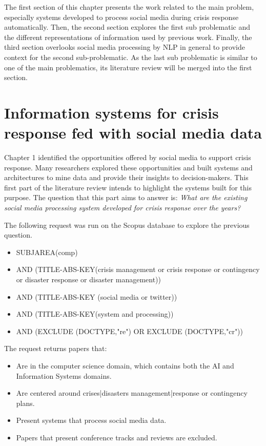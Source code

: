 The first section of this chapter presents the work related to the main problem, especially systems developed to process social media during crisis response automatically.
Then, the second section explores the first sub problematic and the different representations of information used by previous work.
Finally, the third section overlooks social media processing by NLP in general to provide context for the second sub-problematic.
As the last sub problematic is similar to one of the main problematics, its literature review will be merged into the first section.

\section{Information systems for crisis response fed with social media data}
Chapter 1 identified the opportunities offered by social media to support crisis response.
Many researchers explored these opportunities and built systems and architectures to mine data and provide their insights to decision-makers.
This first part of the literature review intends to highlight the systems built for this purpose.
The question that this part aims to answer is: \emph{What are the existing social media processing system developed for crisis response over the years?}

The following request was run on the Scopus database to explore the previous question.

\begin{itemize}
    \item SUBJAREA(comp)
    \item AND (TITLE-ABS-KEY({crisis management} or {crisis response} or contingency or {disaster response} or {disaster management}))
    \item AND (TITLE-ABS-KEY ({social media} or twitter))
    \item AND (TITLE-ABS-KEY(system and processing))
    \item AND (EXCLUDE (DOCTYPE,"re") OR EXCLUDE (DOCTYPE,"cr"))
\end{itemize}

The request returns papers that:

\begin{itemize}
    \item Are in the computer science domain, which contains both the AI and Information Systems domains.
    \item Are centered around crises|disasters management|response or contingency plans.
    \item Present systems that process social media data.
    \item Papers that present conference tracks and reviews are excluded.
\end{itemize}

